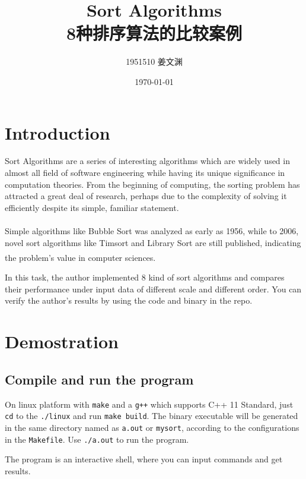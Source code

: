 \documentclass[cn,black,12pt,normal]{elegantnote}
\title{Sort Algorithms\\8种排序算法的比较案例 }
\author{1951510\; 姜文渊}
\institute{\small \url{https://github.com/jwyjohn/Jwy_DataStructureHomework}}
\date{\today}
\newcommand{\uct}[1]{\textsuperscript{\textsuperscript{\cite{#1}}}}
\begin{document}
\maketitle

\section{Introduction}

Sort Algorithms are a series of interesting algorithms which are widely used in almost all field of software engineering while having its unique significance in computation theories. From the beginning of computing, the sorting problem has attracted a great deal of research, perhaps due to the complexity of solving it efficiently despite its simple, familiar statement.

Simple algorithms like Bubble Sort was analyzed as early as 1956\uct{demuth1957electronic}, while to 2006, novel sort algorithms like Timsort and Library Sort are still published, indicating the problem's value in computer sciences.\uct{auger2015merge}

In this task, the author implemented 8 kind of sort algorithms and compares their performance under input data of different scale and different order. You can verify the author's results by using the code and binary in the repo.

\section{Demostration}

\subsection{Compile and run the program}

On linux platform with \lstinline{make} and a \lstinline{g++} which supports C++ 11 Standard, just \lstinline{cd} to the \lstinline{./linux} and run \lstinline{make build}. The binary executable will be generated in the same directory named as \lstinline{a.out} or \lstinline{mysort}, according to the configurations in the \lstinline{Makefile}. Use \lstinline{./a.out} to run the program.

The program is an interactive shell, where you can input commands and get results.
\end{document}
